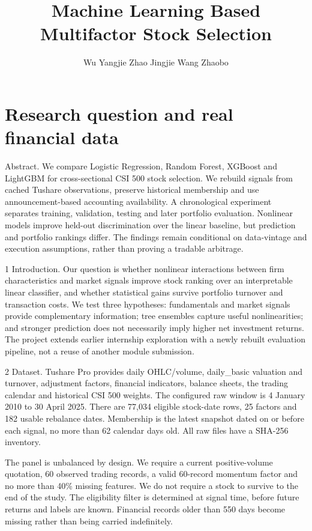 \documentclass{article}
\title{Machine Learning Based Multifactor Stock Selection}
\author{Wu Yangjie \And Zhao Jingjie \And Wang Zhaobo}
\begin{document}
\maketitle
\section*{Research question and real financial data}
Abstract. We compare Logistic Regression, Random Forest, XGBoost and LightGBM for cross-sectional CSI 500 stock selection. We rebuild signals from cached Tushare observations, preserve historical membership and use announcement-based accounting availability. A chronological experiment separates training, validation, testing and later portfolio evaluation. Nonlinear models improve held-out discrimination over the linear baseline, but prediction and portfolio rankings differ. The findings remain conditional on data-vintage and execution assumptions, rather than proving a tradable arbitrage.

1 Introduction. Our question is whether nonlinear interactions between firm characteristics and market signals improve stock ranking over an interpretable linear classifier, and whether statistical gains survive portfolio turnover and transaction costs. We test three hypotheses: fundamentals and market signals provide complementary information; tree ensembles capture useful nonlinearities; and stronger prediction does not necessarily imply higher net investment returns. The project extends earlier internship exploration with a newly rebuilt evaluation pipeline, not a reuse of another module submission.

2 Dataset. Tushare Pro provides daily OHLC/volume, daily\_basic valuation and turnover, adjustment factors, financial indicators, balance sheets, the trading calendar and historical CSI 500 weights. The configured raw window is 4 January 2010 to 30 April 2025. There are 77,034 eligible stock-date rows, 25 factors and 182 usable rebalance dates. Membership is the latest snapshot dated on or before each signal, no more than 62 calendar days old. All raw files have a SHA-256 inventory.

The panel is unbalanced by design. We require a current positive-volume quotation, 60 observed trading records, a valid 60-record momentum factor and no more than 40\% missing features. We do not require a stock to survive to the end of the study. The eligibility filter is determined at signal time, before future returns and labels are known. Financial records older than 550 days become missing rather than being carried indefinitely.
\end{document}
